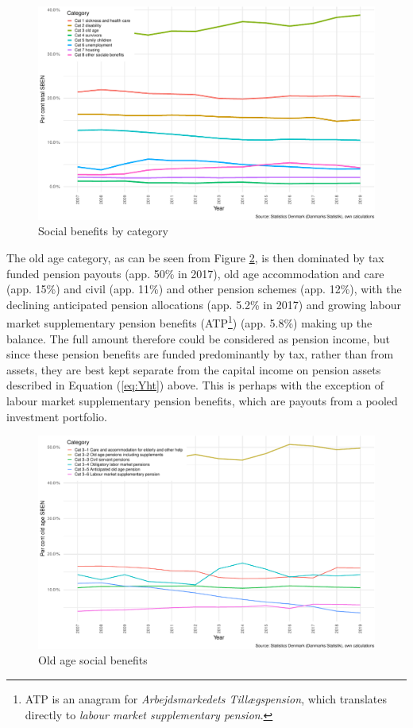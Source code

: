 \documentclass[
]{book}
\begin{document}
\begin{figure}
\centering
\includegraphics{figures/sben-all-dk-1.pdf}
\caption{\label{fig:sben-all-dk}Social benefits by category}
\end{figure}

The old age category, as can be seen from Figure \ref{fig:old-age-public-spend},
is then dominated by tax funded pension payouts (app. 50\% in 2017),
old age accommodation and care (app. 15\%) and civil (app. 11\%) and other pension
schemes (app. 12\%), with the declining anticipated pension allocations (app. 5.2\% in 2017)
and growing labour market supplementary pension benefits (ATP\footnote{ATP is an anagram for \emph{Arbejdsmarkedets Tillægspension}, which translates directly to
  \emph{labour market supplementary pension}.}) (app. 5.8\%) making up the
balance. The full amount therefore could be considered as pension income, but since these
pension benefits are funded predominantly by tax, rather than from assets, they are best
kept separate from the capital income on pension assets described in Equation (\ref{eq:Yht})
above. This is perhaps with the exception of labour market supplementary pension benefits, which are
payouts from a pooled investment portfolio.

\begin{figure}
\centering
\includegraphics{figures/old-age-public-spend-1.pdf}
\caption{\label{fig:old-age-public-spend}Old age social benefits}
\end{figure}
\end{document}
